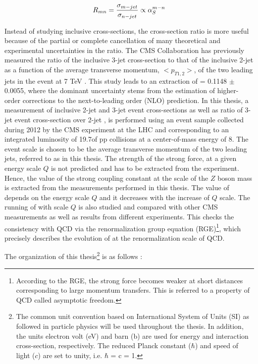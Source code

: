 \begin{equation}
R_{mn} = \frac{\sigma_{m-jet}}{\sigma_{n-jet}} \propto \alps^{m-n}
\label{eq:ratio_mn}
\end{equation}

Instead of studying inclusive cross-sections, the cross-section ratio is more useful because of the partial or complete cancellation of many theoretical and experimental uncertainties in the ratio. The CMS Collaboration has previously measured the ratio of the inclusive 3-jet cross-section to that of the inclusive 2-jet as a function of the average transverse momentum, $<p_{T1,2}>$, of the two leading jets in the event at 7 TeV \cite {Chatrchyan:2013txa}. This study leads to an extraction of \alpsmz = 0.1148 $\pm$ 0.0055, where the dominant uncertainty stems from the estimation of higher-order corrections to the next-to-leading order (NLO) prediction. In this thesis, a measurement of inclusive 2-jet and 3-jet event cross-sections as well as ratio of 3-jet event cross-section over 2-jet \rations, is performed using an event sample collected during 2012 by the CMS experiment at the LHC and corresponding to an integrated luminosity of 19.7\fbinv of pp collisions at a center-of-mass energy of 8\TeV. The event scale is chosen to be the average transverse momentum of the two leading jets, referred to as \httwo in this thesis. The strength of the strong force, \alps at a given energy scale $Q$ is not predicted and has to be extracted from the experiment. Hence, the value of the strong coupling constant at the scale of the $Z$ boson mass \alpsmz is extracted from the measurements performed in this thesis. The value of \alps depends on the energy scale $Q$ and it decreases with the increase of $Q$ scale. The running of \alps with scale $Q$ is also studied and compared with other CMS measurements as well as results from different experiments. This checks the consistency with QCD via the renormalization group equation (RGE)\footnote{According to the RGE, the strong force becomes weaker at short distances corresponding to large momentum transfers. This is referred to a property of QCD called asymptotic freedom.}, which precisely describes the evolution of \alps at the renormalization scale of QCD. 

The organization of this thesis\footnote{The common unit convention based on International System of Units (SI) as followed in particle physics will be used throughout the thesis. In addition, the units electron volt (eV) and barn (b) are used for energy and interaction cross-section, respectively. The reduced Planck constant ($\hbar$) and speed of light ($c$) are set to unity, i.e. $\hbar$ = c = 1.} is as follows :

